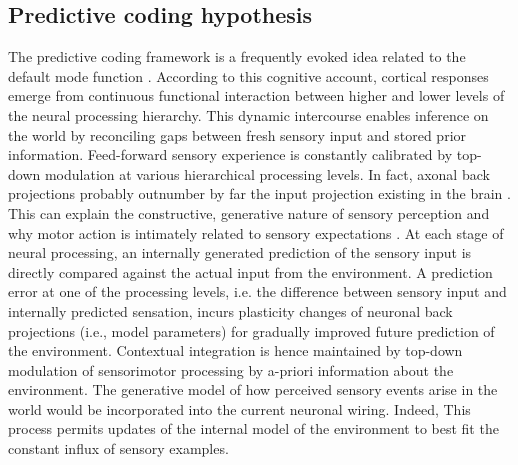 \documentclass[10pt,letterpaper]{article}
\begin{document}
\subsection{Predictive coding hypothesis}
The predictive coding framework
\citep{clark2013whatever, friston2008hierarchical}
is a frequently evoked idea related to the default mode function
\citep{bar2007}.
According to this cognitive account,
cortical responses emerge from continuous functional interaction between
higher and lower levels of the neural processing hierarchy.
This dynamic intercourse enables inference on the world by reconciling
gaps between fresh sensory input and stored prior information.
Feed-forward sensory experience is constantly calibrated by
top-down modulation at various hierarchical processing levels.
In fact, axonal
back projections probably outnumber by far the input projection
existing in the brain \citep{salin1995corticocortical}.
This can explain the constructive, generative nature of sensory perception
\citep{friston2010free} and
why motor action is intimately related to sensory expectations
\citep{wolpert1995internal, kording2004bayesian}.
At each stage of neural processing,
an internally generated prediction of the sensory input is
directly compared against the actual input from the environment.
A prediction error at one of the processing levels,
i.e. the difference between sensory input
and internally predicted sensation,
incurs plasticity changes of neuronal back projections (i.e., model parameters)
for gradually improved future prediction of the environment.
Contextual integration is hence maintained by top-down modulation of sensorimotor
processing by a-priori information about the environment.
The generative model of how perceived sensory events arise in the
world would be incorporated into
the current neuronal wiring.
Indeed,
This process permits updates of the internal model of the environment
to best fit the constant influx of sensory examples.
\end{document}
